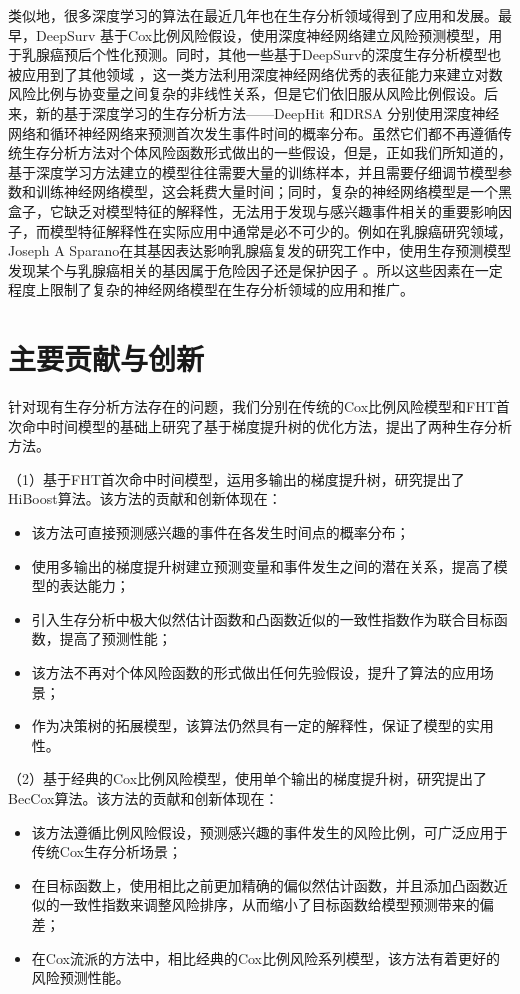类似地，很多深度学习的算法在最近几年也在生存分析领域得到了应用和发展。最早，DeepSurv 基于Cox比例风险假设，使用深度神经网络建立风险预测模型，用于乳腺癌预后个性化预测。同时，其他一些基于DeepSurv的深度生存分析模型也被应用到了其他领域 ，这一类方法利用深度神经网络优秀的表征能力来建立对数风险比例与协变量之间复杂的非线性关系，但是它们依旧服从风险比例假设。后来，新的基于深度学习的生存分析方法——DeepHit 和DRSA 分别使用深度神经网络和循环神经网络来预测首次发生事件时间的概率分布。虽然它们都不再遵循传统生存分析方法对个体风险函数形式做出的一些假设，但是，正如我们所知道的，基于深度学习方法建立的模型往往需要大量的训练样本，并且需要仔细调节模型参数和训练神经网络模型，这会耗费大量时间；同时，复杂的神经网络模型是一个黑盒子，它缺乏对模型特征的解释性，无法用于发现与感兴趣事件相关的重要影响因子，而模型特征解释性在实际应用中通常是必不可少的。例如在乳腺癌研究领域，Joseph A Sparano在其基因表达影响乳腺癌复发的研究工作中，使用生存预测模型发现某个与乳腺癌相关的基因属于危险因子还是保护因子 。所以这些因素在一定程度上限制了复杂的神经网络模型在生存分析领域的应用和推广。

\section{主要贡献与创新}

针对现有生存分析方法存在的问题，我们分别在传统的Cox比例风险模型和FHT首次命中时间模型的基础上研究了基于梯度提升树的优化方法，提出了两种生存分析方法。

（1）基于FHT首次命中时间模型，运用多输出的梯度提升树，研究提出了HiBoost算法。该方法的贡献和创新体现在：
\begin{itemize}
    \item 该方法可直接预测感兴趣的事件在各发生时间点的概率分布；
    \item 使用多输出的梯度提升树建立预测变量和事件发生之间的潜在关系，提高了模型的表达能力；
    \item 引入生存分析中极大似然估计函数和凸函数近似的一致性指数作为联合目标函数，提高了预测性能；
    \item 该方法不再对个体风险函数的形式做出任何先验假设，提升了算法的应用场景；
    \item 作为决策树的拓展模型，该算法仍然具有一定的解释性，保证了模型的实用性。
\end{itemize}

（2）基于经典的Cox比例风险模型，使用单个输出的梯度提升树，研究提出了BecCox算法。该方法的贡献和创新体现在：
\begin{itemize}
    \item 该方法遵循比例风险假设，预测感兴趣的事件发生的风险比例，可广泛应用于传统Cox生存分析场景；
    \item 在目标函数上，使用相比之前更加精确的偏似然估计函数，并且添加凸函数近似的一致性指数来调整风险排序，从而缩小了目标函数给模型预测带来的偏差；
    \item 在Cox流派的方法中，相比经典的Cox比例风险系列模型，该方法有着更好的风险预测性能。
\end{itemize}

